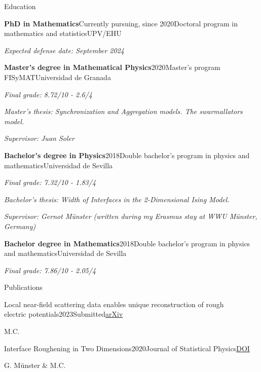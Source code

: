 \documentclass{resume} %
\newcommand{\italicitem}[1]{\item{\textit{#1}}}
\begin{document}
\begin{rSection}{Education}

    \begin{rSubsectionNoBullet}{\bf PhD in Mathematics}{Currently pursuing, since 2020}{Doctoral program in mathematics and statistics}{UPV/EHU}
        \italicitem{Expected defense date: September 2024}
    \end{rSubsectionNoBullet}
    
    \begin{rSubsectionNoBullet}{\bf Master's degree in Mathematical Physics}{2020}{Master's program FISyMAT}{Universidad de Granada}
        \italicitem{Final grade: 8.72/10 - 2.6/4}
        \italicitem{Master's thesis: Synchronization and Aggregation models. The swarmallators model.}
        \italicitem{Supervisor: Juan Soler}
    \end{rSubsectionNoBullet}
    
    \begin{rSubsectionNoBullet}{\bf Bachelor's degree in Physics}{2018}{Double bachelor's program in physics and mathematics}{Universidad de Sevilla}
        \italicitem{Final grade: 7.32/10 - 1.83/4}
        \italicitem{Bachelor's thesis: Width of Interfaces in the 2-Dimensional Ising Model.}
        \italicitem{Supervisor: Gernot M\"unster (written during my Erasmus stay at WWU M\"unster, Germany)}
    \end{rSubsectionNoBullet}

    \begin{rSubsectionNoBullet}{\bf Bachelor degree in Mathematics}{2018}{Double bachelor's program in physics and mathematics}{Universidad de Sevilla}
        \italicitem{Final grade: 7.86/10 - 2.05/4}
    \end{rSubsectionNoBullet}

\end{rSection}


\begin{rSection}{Publications}
    \begin{rSubsectionNoBullet}{Local near-field scattering data enables unique reconstruction of rough\\ electric potentials}{2023}{Submitted}{\href{https://arxiv.org/abs/2311.09036}{arXiv}}
        \item M.C.
    \end{rSubsectionNoBullet}
    \begin{rSubsectionNoBullet}{Interface Roughening in Two Dimensions}{2020}{Journal of Statistical Physics}{\href{https://doi.org/10.1007/s10955-021-02738-w}{DOI}}
        \item G. M\"unster \& M.C.
    \end{rSubsectionNoBullet}
    
\end{rSection}
\end{document}
